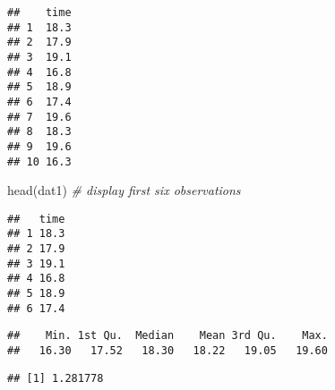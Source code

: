 \documentclass[
]{article}
\newenvironment{Shaded}{\begin{snugshade}}{\end{snugshade}}
\newcommand{\AttributeTok}[1]{\textcolor[rgb]{0.77,0.63,0.00}{#1}}
\newcommand{\CommentTok}[1]{\textcolor[rgb]{0.56,0.35,0.01}{\textit{#1}}}
\newcommand{\ControlFlowTok}[1]{\textcolor[rgb]{0.13,0.29,0.53}{\textbf{#1}}}
\newcommand{\DecValTok}[1]{\textcolor[rgb]{0.00,0.00,0.81}{#1}}
\newcommand{\FloatTok}[1]{\textcolor[rgb]{0.00,0.00,0.81}{#1}}
\newcommand{\FunctionTok}[1]{\textcolor[rgb]{0.00,0.00,0.00}{#1}}
\newcommand{\NormalTok}[1]{#1}
\newcommand{\OtherTok}[1]{\textcolor[rgb]{0.56,0.35,0.01}{#1}}
\newcommand{\SpecialCharTok}[1]{\textcolor[rgb]{0.00,0.00,0.00}{#1}}
\newcommand{\StringTok}[1]{\textcolor[rgb]{0.31,0.60,0.02}{#1}}
\begin{document}
\begin{verbatim}
##    time
## 1  18.3
## 2  17.9
## 3  19.1
## 4  16.8
## 5  18.9
## 6  17.4
## 7  19.6
## 8  18.3
## 9  19.6
## 10 16.3
\end{verbatim}

\begin{Shaded}
\begin{Highlighting}[]
\FunctionTok{head}\NormalTok{(dat1) }\CommentTok{\# display first six observations}
\end{Highlighting}
\end{Shaded}

\begin{verbatim}
##   time
## 1 18.3
## 2 17.9
## 3 19.1
## 4 16.8
## 5 18.9
## 6 17.4
\end{verbatim}

\begin{Shaded}
\end{Shaded}

\begin{verbatim}
##    Min. 1st Qu.  Median    Mean 3rd Qu.    Max. 
##   16.30   17.52   18.30   18.22   19.05   19.60
\end{verbatim}

\begin{Shaded}
\end{Shaded}

\begin{verbatim}
## [1] 1.281778
\end{verbatim}

\begin{Shaded}
\end{Shaded}
\end{document}
